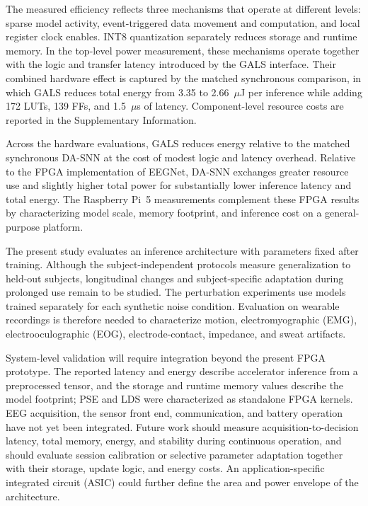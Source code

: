 ﻿\documentclass{nsr}
\begin{document}
The measured efficiency reflects three mechanisms that operate at different levels: sparse model activity, event-triggered data movement and computation, and local register clock enables. INT8 quantization separately reduces storage and runtime memory. In the top-level power measurement, these mechanisms operate together with the logic and transfer latency introduced by the GALS interface. Their combined hardware effect is captured by the matched synchronous comparison, in which GALS reduces total energy from 3.35 to 2.66~$\mu$J per inference while adding 172 LUTs, 139 FFs, and 1.5~$\mu$s of latency. Component-level resource costs are reported in the Supplementary Information.

Across the hardware evaluations, GALS reduces energy relative to the matched synchronous DA-SNN at the cost of modest logic and latency overhead. Relative to the FPGA implementation of EEGNet, DA-SNN exchanges greater resource use and slightly higher total power for substantially lower inference latency and total energy. The Raspberry Pi~5 measurements complement these FPGA results by characterizing model scale, memory footprint, and inference cost on a general-purpose platform.

The present study evaluates an inference architecture with parameters fixed after training. Although the subject-independent protocols measure generalization to held-out subjects, longitudinal changes and subject-specific adaptation during prolonged use remain to be studied. The perturbation experiments use models trained separately for each synthetic noise condition. Evaluation on wearable recordings is therefore needed to characterize motion, electromyographic (EMG), electrooculographic (EOG), electrode-contact, impedance, and sweat artifacts.

System-level validation will require integration beyond the present FPGA prototype. The reported latency and energy describe accelerator inference from a preprocessed tensor, and the storage and runtime memory values describe the model footprint; PSE and LDS were characterized as standalone FPGA kernels. EEG acquisition, the sensor front end, communication, and battery operation have not yet been integrated. Future work should measure acquisition-to-decision latency, total memory, energy, and stability during continuous operation, and should evaluate session calibration or selective parameter adaptation together with their storage, update logic, and energy costs. An application-specific integrated circuit (ASIC) could further define the area and power envelope of the architecture.
\end{document}
